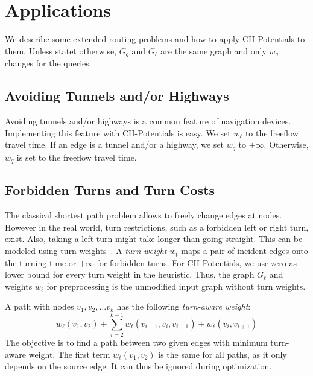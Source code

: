 \documentclass[a4paper,USenglish,cleveref, autoref, thm-restate]{lipics-v2019}
\begin{document}
\section{Applications}
\label{sec:extensions}

We describe some extended routing problems and how to apply CH-Potentials to them.
Unless statet otherwise, $G_q$ and $G_\ell$ are the same graph and only $w_q$ changes for the queries.

\subsection{Avoiding Tunnels and/or Highways}
\label{sec:no-tunnel-highway}

Avoiding tunnels and/or highways is a common feature of navigation devices.
Implementing this feature with CH-Potentials is easy.
We set $w_\ell$ to the freeflow travel time.
If an edge is a tunnel and/or a highway, we set $w_q$ to $+\infty$.
Otherwise, $w_q$ is set to the freeflow travel time.

\subsection{Forbidden Turns and Turn Costs}
\label{sec:no-turns}

The classical shortest path problem allows to freely change edges at nodes.
However in the real world, turn restrictions, such as a forbidden left or right turn, exist.
Also, taking a left turn might take longer than going straight.
This can be modeled using turn weights~\cite{gv-errnt-11,dgpw-crprn-13,bwzz-cchtc-20}.
A \emph{turn weight} $w_t$ maps a pair of incident edges onto the turning time or $+\infty$ for forbidden turns.
For CH-Potentials, we use zero as lower bound for every turn weight in the heuristic.
Thus, the graph $G_\ell$ and weights $w_\ell$ for preprocessing is the unmodified input graph without turn weights.

A path with nodes $v_1, v_2,\ldots v_k$ has the following \emph{turn-aware weight}: \[
w_\ell(v_1, v_2) + \sum_{i=2}^{k-1}  w_t(v_{i-1},v_i,v_{i+1}) + w_\ell(v_i,v_{i+1})
\]
The objective is to find a path between two given edges with minimum turn-aware weight.
The first term $w_\ell(v_1, v_2)$ is the same for all paths, as it only depends on the source edge.
It can thus be ignored during optimization.
\end{document}

